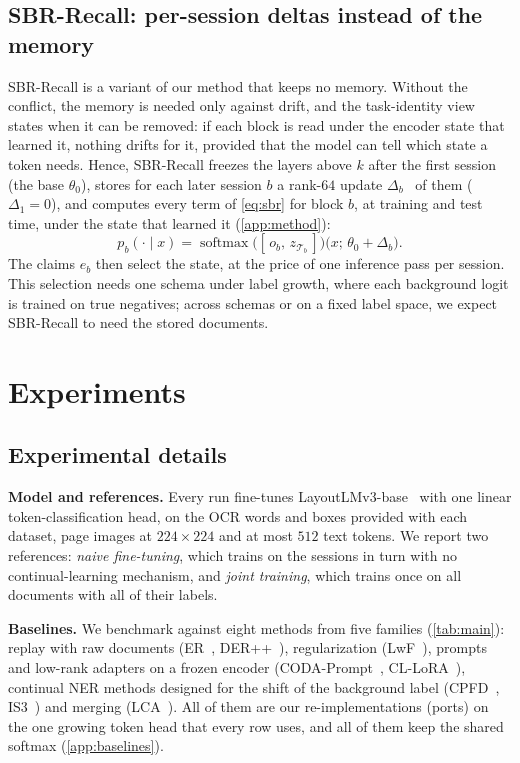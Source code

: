 \documentclass[10pt,twocolumn,letterpaper]{article}
\newcommand{\runin}[1]{\par\addvspace{0.7ex plus .3ex minus .1ex}\noindent\textbf{#1}\hspace{1em}\ignorespaces}
\begin{document}
\subsection{SBR-Recall: per-session deltas instead of the memory}
\label{sec:recall}
SBR-Recall is a variant of our method that keeps no memory. Without the conflict, the memory is needed only against drift, and the task-identity view~\citep{kim2022theoretical} states when it can be removed: if each block is read under the encoder state that learned it, nothing drifts for it, provided that the model can tell which state a token needs. Hence, SBR-Recall freezes the layers above $k$ after the first session (the base $\theta_0$), stores for each later session $b$ a rank-$64$ update $\Delta_b$~\citep{hu2022lora} of them ($\Delta_1{=}0$), and computes every term of \cref{eq:sbr} for block $b$, at training and test time, under the state that learned it (\cref{app:method}):
\begin{equation}
p_b(\cdot\mid x)=\operatorname{softmax}\big([\,o_b,\,z_{\mathcal{T}_b}\,]\big)\big(x;\,\theta_0+\Delta_b\big).
\label{eq:recall}
\end{equation}
The claims $e_b$ then select the state, at the price of one inference pass per session. This selection needs one schema under label growth, where each background logit is trained on true negatives; across schemas or on a fixed label space, we expect SBR-Recall to need the stored documents.

\section{Experiments}
\label{sec:experiments}
\subsection{Experimental details}
\runin{Model and references.} Every run fine-tunes LayoutLMv3-base~\citep{huang2022layoutlmv3} with one linear token-classification head, on the OCR words and boxes provided with each dataset, page images at $224{\times}224$ and at most $512$ text tokens. We report two references: \emph{naive fine-tuning}, which trains on the sessions in turn with no continual-learning mechanism, and \emph{joint training}, which trains once on all documents with all of their labels.

\runin{Baselines.} We benchmark against eight methods from five families (\cref{tab:main}): replay with raw documents (ER~\citep{rolnick2019er}, DER++~\citep{buzzega2020der}), regularization (LwF~\citep{li2017lwf}), prompts and low-rank adapters on a frozen encoder (CODA-Prompt~\citep{smith2023coda}, CL-LoRA~\citep{he2025cllora}), continual NER methods designed for the shift of the background label (CPFD~\citep{zhang2023cpfd}, IS3~\citep{qiu2024is3}) and merging (LCA~\citep{lca2026}). All of them are our re-implementations (ports) on the one growing token head that every row uses, and all of them keep the shared softmax (\cref{app:baselines}).
\end{document}
